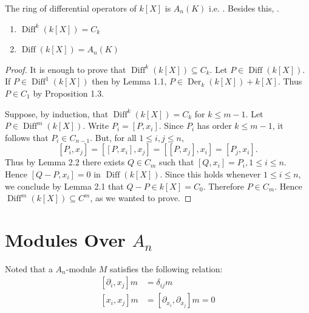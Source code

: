 \documentclass[12pt, oneside]{book}
\begin{document}
\begin{theorem}
    The ring of differential operators of $k[X]$ is $A_n(K)$ i.e. .
    Besides this, .
    \begin{enumerate}
        \item
              $\operatorname{Diff}^k(k[X])=C_k$
        \item
              $\operatorname{Diff}(k[X])=A_n(K)$

    \end{enumerate}
    \begin{proof}
        It is enough to prove that $\operatorname{Diff}^k(k[X]) \subseteq C_k$. Let $P \in \operatorname{Diff}(k[X])$. If $P \in \operatorname{Diff}^1(k[X])$ then by Lemma 1.1, $P \in \operatorname{Der}_k(k[X])+k[X]$. Thus $P \in C_1$ by Proposition 1.3.

        Suppose, by induction, that $\operatorname{Diff}^k(k[X])=C_k$ for $k \leq m-1$. Let $P \in \operatorname{Diff}^m(k[X])$. Write $P_i=\left[P, x_i\right]$. Since $P_i$ has order $k \leq m-1$, it follows that $P_i \in C_{n-1}$. But, for all $1 \leq i, j \leq n$,
        \begin{equation*}
            \left[P_i, x_j\right]=\left[\left[P, x_i\right], x_j\right]=\left[\left[P, x_j\right], x_i\right]=\left[P_j, x_i\right] .
        \end{equation*}
        Thus by Lemma 2.2 there exists $Q \in C_m$ such that $\left[Q, x_i\right]=P_i, 1 \leq i \leq n$. Hence $\left[Q-P, x_i\right]=0$ in $\operatorname{Diff}(k[X])$. Since this holds whenever $1 \leq i \leq n$, we conclude by Lemma 2.1 that $Q-P \in k[X]=C_0$. Therefore $P \in C_m$. Hence $\operatorname{Diff}^m(k[X]) \subseteq C^m$, as we wanted to prove.
    \end{proof}
\end{theorem}




\section{Modules Over $A_n$}

Noted that a $A_n$-module $M$ satisfies the following relation:
\begin{equation*}
    \begin{aligned}
        \left[\partial_i, x_j\right] m & =\delta_{ij}m                                   \\
        \left[x_i, x_j\right]m         & =\left[\partial_{x_i}, \partial_{x_j}\right]m=0
    \end{aligned}
\end{equation*}
\end{document}
